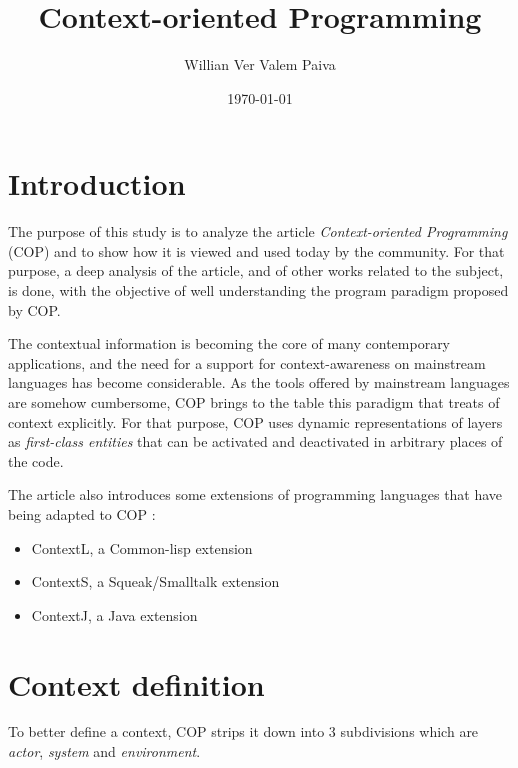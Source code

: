 \documentclass[journal,10pt,compsoc]{IEEEtran}
\author{Willian Ver Valem Paiva}
\date{\today}
\title{Context-oriented Programming}
\begin{document}
\maketitle

\section{Introduction}
\label{sec:orgf65930b}
The purpose of this study is to analyze the article \emph{Context-oriented Programming} (COP) \cite{hirschfeld2008context} 
and to show how it is viewed and used today by the community. 
For that purpose, a deep analysis of the article, and of other works related to the subject, is done, with the objective of 
well understanding the program paradigm proposed by COP. 

The contextual information is becoming the core of many contemporary applications, and the need for a support  
for context-awareness on mainstream languages has become considerable.  
As the tools offered by mainstream languages are somehow cumbersome, COP brings to the table 
this paradigm that treats of context explicitly.
For that purpose, COP uses dynamic representations of layers as \emph{first-class entities} that can be activated and deactivated in arbitrary places of the code.


The article also introduces some extensions of programming languages that have being adapted to COP :
\begin{itemize}
\item ContextL, a Common-lisp extension
\item ContextS, a Squeak/Smalltalk extension
\item ContextJ, a Java extension \cite{appeltauer2011contextj}
\end{itemize}



\section{Context definition}
\label{sec:org7e84e55}
To better define a context, COP strips it down into 3 subdivisions which are \emph{actor}, \emph{system} and \emph{environment}.
\end{document}
